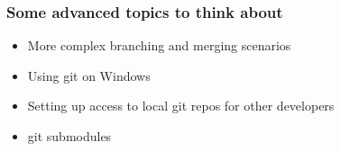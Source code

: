 \documentclass{beamer}%
\begin{document}

\begin{frame}
	\frametitle{Some advanced topics to think about}
	
	\begin{itemize}
		\item More complex branching and merging scenarios
		\item Using git on Windows
		\item Setting up access to local git repos for other developers
		\item git submodules
	\end{itemize}
	
\end{frame}

\end{document}
